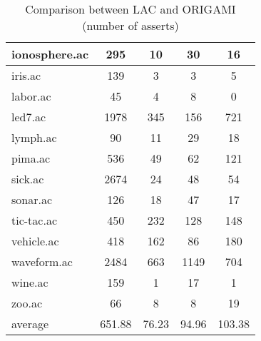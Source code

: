 \begin{table}[htbp]
\begin{tabular}{|l|c|c|c|c|}
		\hline
		ionosphere.ac   & 295           & 10                 & 30                       & 16                            \\
		\hline
		iris.ac         & 139           & 3                  & 3                        & 5                             \\
		\hline
		labor.ac        & 45            & 4                  & 8                        & 0                             \\
		\hline
		led7.ac         & 1978          & 345                & 156                      & 721                           \\
		\hline
		lymph.ac        & 90            & 11                 & 29                       & 18                            \\
		\hline
		pima.ac         & 536           & 49                 & 62                       & 121                           \\
		\hline
		sick.ac         & 2674          & 24                 & 48                       & 54                            \\
		\hline
		sonar.ac        & 126           & 18                 & 47                       & 17                            \\
		\hline
		tic-tac.ac      & 450           & 232                & 128                      & 148                           \\
		\hline
		vehicle.ac      & 418           & 162                & 86                       & 180                           \\
		\hline
		waveform.ac     & 2484          & 663                & 1149                     & 704                           \\
		\hline
		wine.ac         & 159           & 1                  & 17                       & 1                             \\
		\hline
		zoo.ac          & 66            & 8                  & 8                        & 19                            \\
		\hline
		average         & 651.88        & 76.23              & 94.96                    & 103.38                        \\
		\hline
		\end{tabular}
	\caption{Comparison between LAC and ORIGAMI (number of asserts)}
	\label{tab:comparison_lac_origami}
\end{table}